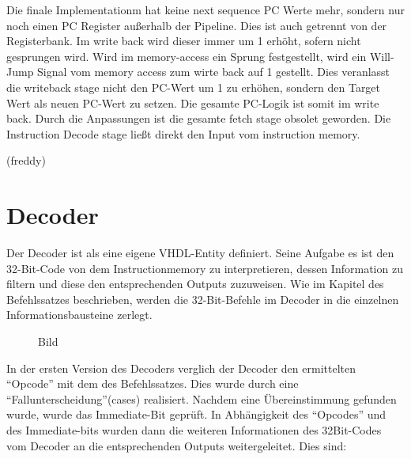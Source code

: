 \documentclass[paper=a4,fontsize=12pt,twocolumn]{scrreprt}
\begin{document}
Die finale Implementationm hat keine next sequence PC Werte mehr, sondern nur noch einen PC Register außerhalb der Pipeline.
Dies ist auch getrennt von der Registerbank.
Im write back wird dieser immer um 1 erhöht, sofern nicht gesprungen wird.
Wird im memory-access ein Sprung festgestellt, wird ein Will-Jump Signal vom memory access zum wirte back auf 1 gestellt.
Dies veranlasst die writeback stage nicht den PC-Wert um 1 zu erhöhen, sondern den Target Wert als neuen PC-Wert zu setzen.
Die gesamte PC-Logik ist somit im write back.
Durch die Anpassungen ist die gesamte fetch stage obsolet geworden.
Die  Instruction Decode stage ließt direkt den Input vom instruction memory.


(freddy)

\section{Decoder}

Der Decoder ist als eine eigene VHDL-Entity definiert.
Seine Aufgabe es ist den 32-Bit-Code von dem Instructionmemory zu interpretieren, dessen Information zu filtern und diese den entsprechenden Outputs zuzuweisen.
Wie im Kapitel des Befehlssatzes beschrieben, werden die 32-Bit-Befehle im Decoder in die einzelnen Informationsbausteine zerlegt.

\begin{figure}[h]
\centering
\caption{Bild}
\end{figure}

In der ersten Version des Decoders verglich der Decoder den ermittelten \enquote{Opcode} mit dem des Befehlssatzes.
Dies wurde durch eine \enquote{Fallunterscheidung}(cases) realisiert.
Nachdem eine Übereinstimmung gefunden wurde, wurde das Immediate-Bit geprüft.
In Abhängigkeit des \enquote{Opcodes} und des Immediate-bits wurden dann die weiteren Informationen des 32Bit-Codes vom Decoder an die entsprechenden Outputs weitergeleitet.
Dies sind:
\end{document}

